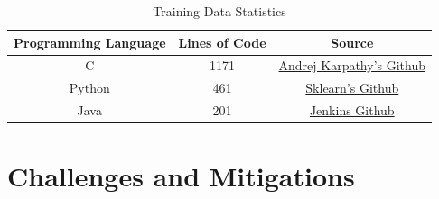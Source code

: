 \documentclass[12pt]{scrreprt}
\begin{document}
\begin{table}[h]
    \centering
    \begin{tabular}{|c|c|c|}
        \hline
        \textbf{Programming Language} & \textbf{Lines of Code} & Source \\
        \hline
        C & 1171 & \href{https://github.com/karpathy/llm.c/blob/master/train_gpt2.c}{Andrej Karpathy's Github} \\
        \hline
        Python & 461 & \href{https://github.com/scikit-learn/scikit-learn/blob/main/sklearn/covariance/_robust_covariance.py}{Sklearn's Github} \\
        \hline
        Java & 201 & \href{https://github.com/jenkinsci/jenkins/tree/master}{Jenkins Github} \\
        \hline
    \end{tabular}
    \caption{Training Data Statistics}
    \label{tab:training-data}
\end{table}



\section{Challenges and Mitigations}
\end{document}
